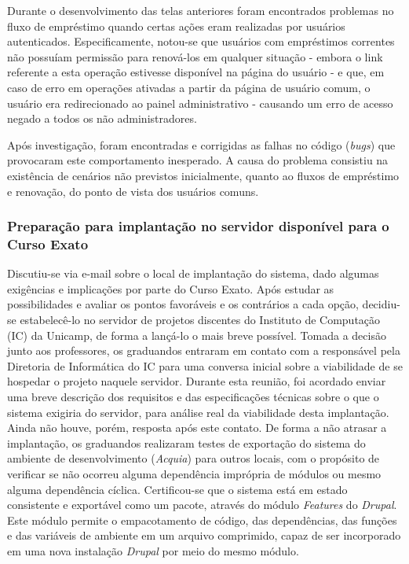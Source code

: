 \documentclass[a4paper]{article}
\begin{document}
Durante o desenvolvimento das telas anteriores foram encontrados problemas no fluxo de empréstimo quando certas ações eram realizadas por usuários autenticados. Especificamente, notou-se que usuários com empréstimos correntes não possuíam permissão para renová-los em qualquer situação - embora o link referente a esta operação estivesse disponível na página do usuário - e que, em caso de erro em operações ativadas a partir da página de usuário comum, o usuário era redirecionado ao painel administrativo - causando um erro de acesso negado a todos os não administradores.

Após investigação, foram encontradas e corrigidas as falhas no código (\textit{bugs}) que provocaram este comportamento inesperado. A causa do problema consistiu na existência de cenários não previstos inicialmente, quanto ao fluxos de empréstimo e renovação, do ponto de vista dos usuários comuns.

\subsubsection{Preparação para implantação no servidor disponível para o Curso Exato}

Discutiu-se via e-mail sobre o local de implantação do sistema, dado algumas exigências e implicações por parte do Curso Exato. Após estudar as possibilidades e avaliar os pontos favoráveis e os contrários a cada opção, decidiu-se estabelecê-lo no servidor de projetos discentes do Instituto de Computação (IC) da Unicamp, de forma a lançá-lo o mais breve possível.
Tomada a decisão junto aos professores, os graduandos entraram em contato com a responsável pela Diretoria de Informática do IC para uma conversa inicial sobre a viabilidade de se hospedar o projeto naquele servidor. Durante esta reunião, foi acordado enviar uma breve descrição dos requisitos e das especificações técnicas sobre o que o sistema exigiria do servidor, para análise real da viabilidade desta implantação. Ainda não houve, porém, resposta após este contato.
    De forma a não atrasar a implantação, os graduandos realizaram testes de exportação do sistema do ambiente de desenvolvimento (\textit{Acquia}) para outros locais, com o propósito de verificar se não ocorreu alguma dependência imprópria de módulos ou mesmo alguma dependência cíclica. Certificou-se que o sistema está em estado consistente e exportável como um pacote, através do módulo \textit{Features} do \textit{Drupal}. Este módulo permite o empacotamento de código, das dependências, das funções e das variáveis de ambiente em um arquivo comprimido, capaz de ser incorporado em uma nova instalação \textit{Drupal} por meio do mesmo módulo.
\end{document}

